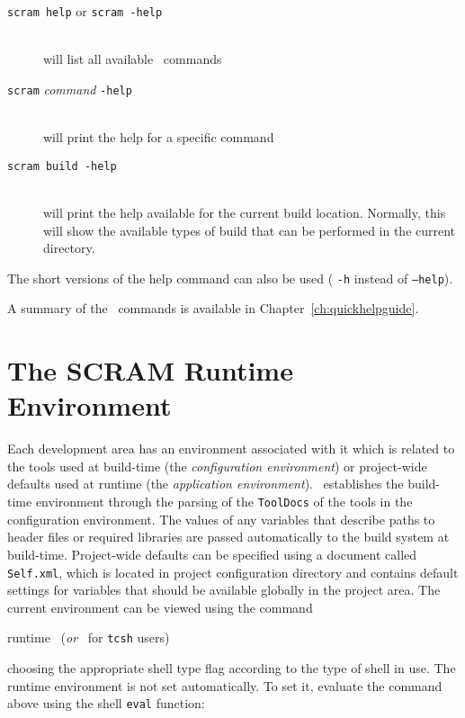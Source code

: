 \begin{description}     
\item[\texttt{scram help} or \texttt{scram -help}]\mbox{}\\
  will list all available \scram\ commands
\item[\texttt{scram} \textit{command} \texttt{-help}]\mbox{}\\
  will print the help for a specific command
\item[\texttt{scram build -help}]\mbox{}\\
  will print the help available for the current build location.
  Normally, this will show the available types of build that can be
  performed in the current directory.
\end{description}

\ni The short versions of the help command can also be used (\ie
\texttt{-h} instead of \texttt{--help}). 

\ni A summary of the \scram\ commands is available in Chapter~\ref{ch:quickhelpguide}.


\section{The SCRAM Runtime Environment}\label{sec:scramruntimeenv}
Each development area has an environment associated with it which is
related to the tools used at build-time (the \textit{configuration
  environment}) or project-wide defaults used at runtime (the
\textit{application environment}).  \scram\ establishes the build-time
environment through the parsing of the \texttt{ToolDocs} of the tools
in the configuration environment. The values of any variables that
describe paths to header files or required libraries are passed
automatically to the build system at build-time. Project-wide defaults
can be specified using a document called \texttt{Self.xml}, which is
located in project configuration directory and contains default
settings for variables that should be available globally in the
project area.
\ni The current environment can be viewed using the command

\begin{scramcmd}{runtime}
  ~(\textit{or}~ for \texttt{tcsh} users)
\end{scramcmd}

\ni choosing the appropriate shell type flag according to the type of
shell in use. The runtime environment is not set automatically. To set
it, evaluate the command above using the shell \texttt{eval} function:

